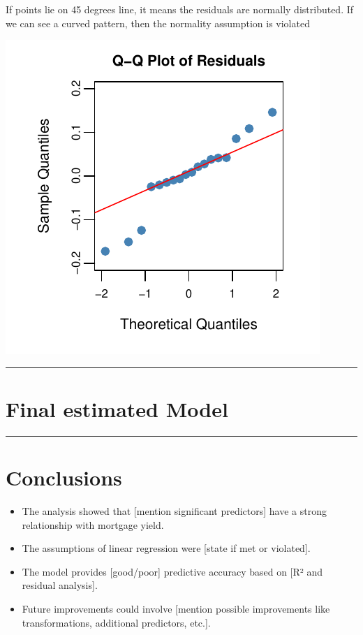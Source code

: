 \documentclass[
  11pt,
]{article}
\providecommand{\tightlist}{%
  \setlength{\itemsep}{0pt}\setlength{\parskip}{0pt}}
\begin{document}
If points lie on 45 degrees line, it means the residuals are normally
distributed. If we can see a curved pattern, then the normality
assumption is violated

\includegraphics{Figs/unnamed-chunk-22-1.pdf}

\begin{center}\rule{0.5\linewidth}{0.5pt}\end{center}

\section{Final estimated Model}\label{final-estimated-model}

\begin{center}\rule{0.5\linewidth}{0.5pt}\end{center}

\section{Conclusions}\label{conclusions}

\begin{itemize}
\tightlist
\item
  The analysis showed that {[}mention significant predictors{]} have a
  strong relationship with mortgage yield.
\item
  The assumptions of linear regression were {[}state if met or
  violated{]}.
\item
  The model provides {[}good/poor{]} predictive accuracy based on {[}R²
  and residual analysis{]}.
\item
  Future improvements could involve {[}mention possible improvements
  like transformations, additional predictors, etc.{]}.
\end{itemize}
\end{document}
